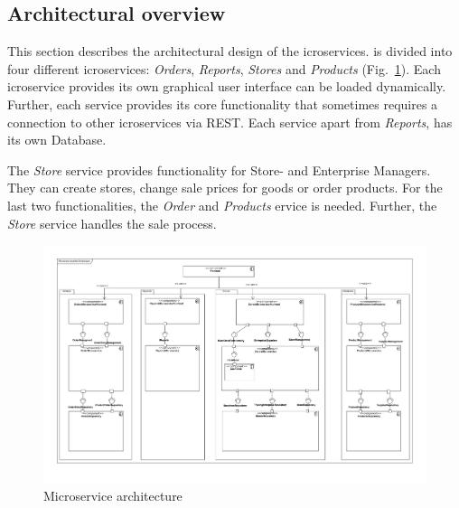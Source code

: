 	\FloatBarrier
	\subsection{Architectural overview}	\label{archiOverviewMicro}	
	This section describes the architectural design of the icroservices. 
	\CoCoME is divided into four different icroservices: \textit{Orders}, \textit{Reports}, \textit{Stores} and \textit{Products} (Fig.~\ref{MS_ARch}). 
	Each icroservice provides its own graphical user interface
	 can be loaded dynamically. 
	Further, each service provides its core functionality that sometimes requires a connection to other icroservices via REST. 
	Each service apart from \textit{Reports}, has its own Database.

	The \textit{Store} service provides functionality for Store- and Enterprise Managers. 
	They can create stores, change sale prices for goods or order products. 
	For the last two functionalities, the \textit{Order} and \textit{Products} ervice is needed. 
	Further, the \textit{Store} service handles the sale process. 
	


	
	
	\begin{figure}
	   	\includegraphics[width=\textwidth]{img/MicroserviceArchitecture.pdf}
	   	\caption{Microservice architecture}
	   	\label{MS_ARch}
	\end{figure}
